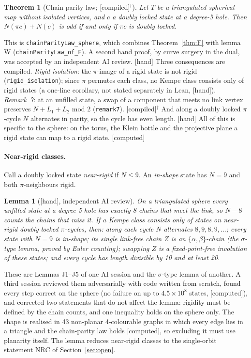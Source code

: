 \documentclass[11pt]{article}
\newtheorem{theorem}{Theorem}\newtheorem{lemma}{Lemma}\newtheorem{conjecture}{Conjecture}
\newcommand{\lab}[1]{\textsf{[#1]}}
\begin{document}
\begin{theorem}[Chain-parity law; \lab{compiled}$^\dagger$]\label{thm:law}
Let $T$ be a triangulated spherical map without isolated vertices, and $c$ a doubly locked state at a degree-5 hole. Then $N(\pi c)+N(c)$ is odd if and only if $\pi c$ is doubly locked.
\end{theorem}
This is \texttt{chainParityLaw\_sphere}, which combines Theorem~\ref{thm:F} with lemma W (\texttt{chainParityLaw\_of\_F}). A second hand proof, by curve surgery in the dual, was accepted by an independent AI review. \lab{hand} Three consequences are compiled. \emph{Rigid isolation}: the $\pi$-image of a rigid state is not rigid (\texttt{rigid\_isolation}); since $\pi$ permutes each class, no Kempe class consists only of rigid states (a one-line corollary, not stated separately in Lean, \lab{hand}). \emph{Remark~7}: at an unfilled state, a swap of a component that meets no link vertex preserves $N+L_1+L_2$ mod 2 (\texttt{remark7}). \lab{compiled}$^\dagger$ And along a doubly locked $\pi$-cycle $N$ alternates in parity, so the cycle has even length. \lab{hand} All of this is specific to the sphere: on the torus, the Klein bottle and the projective plane a rigid state can map to a rigid state. \lab{computed}

\paragraph{Near-rigid classes.} Call a doubly locked state \emph{near-rigid} if $N\le9$. An \emph{in-shape} state has $N=9$ and both $\pi$-neighbours rigid.
\begin{lemma}[\lab{hand}, independent AI review]\label{lem:J}
On a triangulated sphere every unfilled state at a degree-5 hole has exactly 8 chains that meet the link, so $N-8$ counts the chains that miss it. If a Kempe class consists only of states on near-rigid doubly locked $\pi$-cycles, then: along each cycle $N$ alternates $8,9,8,9,\dots$; every state with $N=9$ is in-shape; its single link-free chain $Z$ is an $\{\alpha,\beta\}$-chain (the \emph{$\sigma$-type lemma}, proved by Euler counting); swapping $Z$ is a fixed-point-free involution of these states; and every cycle has length divisible by 10 and at least 20.
\end{lemma}
These are Lemmas J1--J5 of one AI session and the $\sigma$-type lemma of another. A third session reviewed them adversarially with code written from scratch, found every step correct on the sphere (no failure on up to $4.5\times10^8$ states, \lab{computed}), and corrected two statements that do not affect the lemma: rigidity must be defined by the chain counts, and one inequality holds on the sphere only. The shape is realised in 43 non-planar 4-colourable graphs in which every edge lies in a triangle and the chain-parity law holds \lab{computed}, so excluding it must use planarity itself. The lemma reduces near-rigid classes to the single-orbit statement NRC of Section~\ref{sec:open}.
\end{document}
